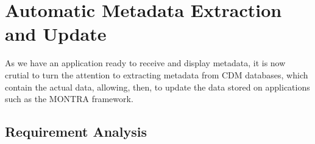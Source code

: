 \chapter{Automatic Metadata Extraction and Update}
\graphicspath{{figs/04-extraction-update/}}

As we have an application ready to receive and display metadata, it is now crutial to turn the attention to extracting metadata from CDM databases, which contain the actual data, allowing, then, to update the data stored on applications such as the MONTRA framework.

\section{Requirement Analysis}


